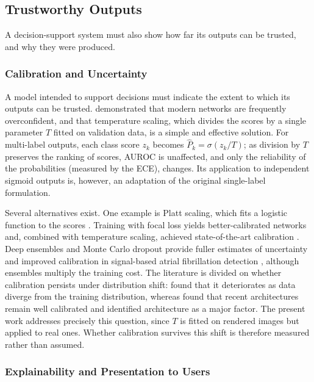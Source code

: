 \documentclass[12pt,nonacm,acmlarge,titlepage,screen]{acmart}
\begin{document}
\subsection{Trustworthy Outputs}
\label{sec:trust-group}

A decision-support system must also show how far its outputs can be trusted, and why they were produced.

\subsubsection{Calibration and Uncertainty}
\label{sec:calibration}

A model intended to support decisions must indicate the extent to which its outputs can be trusted. \citet{guo_calibration_2017} demonstrated that modern networks are frequently overconfident, and that temperature scaling, which divides the scores by a single parameter $T$ fitted on validation data, is a simple and effective solution. For multi-label outputs, each class score $z_k$ becomes $\hat{P}_k = \sigma(z_k/T)$; as division by $T$ preserves the ranking of scores, AUROC is unaffected, and only the reliability of the probabilities (measured by the ECE), changes. Its application to independent sigmoid outputs is, however, an adaptation of the original single-label formulation.

Several alternatives exist. One example is Platt scaling, which fits a logistic function to the scores \cite{platt_probabilistic_1999}. Training with focal loss yields better-calibrated networks and, combined with temperature scaling, achieved state-of-the-art calibration \cite{mukhoti_calibrating_2020}. Deep ensembles \cite{lakshminarayanan_simple_2017} and Monte Carlo dropout \cite{gal_dropout_2016} provide fuller estimates of uncertainty and improved calibration in signal-based atrial fibrillation detection \cite{chen_quantifying_2022}, although ensembles multiply the training cost. The literature is divided on whether calibration persists under distribution shift: \citet{ovadia_trust_2019} found that it deteriorates as data diverge from the training distribution, whereas \citet{minderer_revisiting_2021} found that recent architectures remain well calibrated and identified architecture as a major factor. The present work addresses precisely this question, since $T$ is fitted on rendered images but applied to real ones. Whether calibration survives this shift is therefore measured rather than assumed.

\subsubsection{Explainability and Presentation to Users}
\label{sec:explainability}
\end{document}
